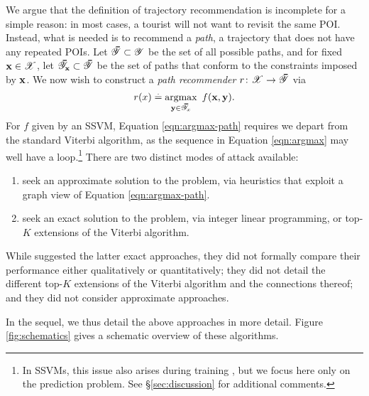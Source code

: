 We argue that the definition of trajectory recommendation is incomplete for a simple reason:
in most cases, a tourist will not want to revisit the same POI.
Instead, what is needed is to recommend a \emph{path}, \ie a trajectory that does not have any repeated POIs.
Let $\thickbar{\YCal} \subset \YCal$ be the set of all possible paths,
and for fixed $\mathbf{x} \in \mathscr{X}$, let $\thickbar{\YCal}_{\x} \subset \thickbar{\YCal}$ be the set of paths that conform to the constraints imposed by $\mathbf{x}$.
We now wish to construct a \emph{path recommender} $r \colon \XCal \to \thickbar{\YCal}$ via
\begin{equation}
	\label{eqn:argmax-path}
	r( x ) \defEq \argmax_{\y \in \thickbar{\YCal}_x}~f(\x, \y).
\end{equation}
For $f$ given by an SSVM, Equation \ref{eqn:argmax-path} requires we depart from the standard Viterbi algorithm, as the sequence in Equation \ref{eqn:argmax} may well have a loop.\footnote{In SSVMs, this issue also arises during training \citep{Chen:2017}, but we focus here only on the prediction problem. See \S\ref{sec:discussion} for additional comments.}
There are two distinct modes of attack available:
\begin{enumerate}
	\item seek an approximate solution to the problem,
	via heuristics that exploit a graph view of Equation \ref{eqn:argmax-path}.

	\item seek an exact solution to the problem,
	via integer linear programming,
	or top-$K$ extensions of the Viterbi algorithm. %
\end{enumerate}
While \citet{Chen:2017} suggested the latter exact approaches, they did not formally compare their performance either qualitatively or quantitatively;
they did not detail the different top-$K$ extensions of the Viterbi algorithm and the connections thereof;
and they did not consider approximate approaches.

In the sequel, we thus detail the above approaches in more detail.
Figure \ref{fig:schematics} gives a schematic overview of these algorithms.


